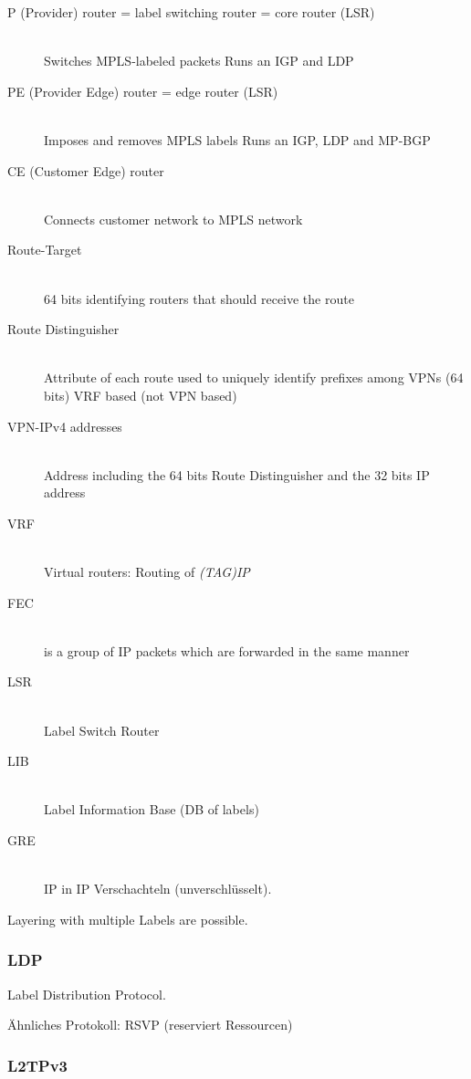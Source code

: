 \begin{description}
	\item[P (Provider) router = label switching router = core router (LSR)] \hfill \\
		Switches MPLS-labeled packets
		Runs an IGP and LDP
	\item[PE (Provider Edge) router = edge router (LSR)] \hfill \\
		Imposes and removes MPLS labels
		Runs an IGP, LDP and MP-BGP
	\item[CE (Customer Edge) router] \hfill \\
		Connects customer network to MPLS network
	\item[Route-Target] \hfill \\
		64 bits identifying routers that should receive the route
	\item[Route Distinguisher] \hfill \\
		Attribute of each route used to uniquely identify prefixes among VPNs (64 bits)
		VRF based (not VPN based)
	\item[VPN-IPv4 addresses] \hfill \\
		Address including the 64 bits Route Distinguisher and the 32 bits IP address
	\item[VRF] \hfill \\
		Virtual routers: Routing of \emph{(TAG)IP}
	\item[FEC] \hfill \\
		is a group of IP packets which are forwarded in the same manner
	\item[LSR] \hfill \\
		Label Switch Router
	\item[LIB] \hfill \\
		Label Information Base (DB of labels)
	\item[GRE] \hfill \\
		IP in IP Verschachteln (unverschlüsselt).
\end{description}

Layering with multiple Labels are possible.


\subsubsection{LDP}

Label Distribution Protocol.

Ähnliches Protokoll: RSVP (reserviert Ressourcen)

\subsubsection{L2TPv3}

